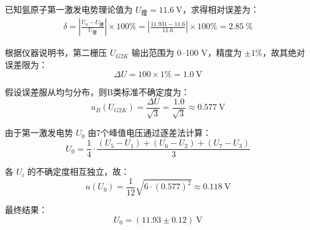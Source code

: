 \documentclass[]{../../templates/Report}%
\begin{document}
\begin{fullreportonly}
已知氩原子第一激发电势理论值为 $U_{\text{理}} = \SI{11.6}{\volt}$，求得相对误差为：
\begin{align*}
\delta = \left| \frac{\bar{U}_0 - U_{\text{理}}}{U_{\text{理}}} \right| \times 100\% = \left| \frac{11.931 - 11.6}{11.6} \right| \times 100\%= \SI{2.85}{\percent}
\end{align*}

根据仪器说明书，第二栅压 $U_{G2K}$ 输出范围为 0--100 V，精度为 $\pm 1\%$，故其绝对误差限为：
\[
\Delta U = 100 \times 1\% = \SI{1.0}{\volt}
\]

假设误差服从均匀分布，则B类标准不确定度为：
\[
u_B(U_{G2K}) = \frac{\Delta U}{\sqrt{3}} = \frac{1.0}{\sqrt{3}} \approx \SI{0.577}{\volt}
\]

由于第一激发电势 $U_0$ 由7个峰值电压通过逐差法计算：
\[
U_0 = \frac{1}{4} \cdot \frac{(U_5 - U_1) + (U_6 - U_2) + (U_7 - U_3)}{3}
\]

各 $U_i$ 的不确定度相互独立，故：
\[
u(U_0) = \frac{1}{12} \sqrt{6 \cdot (0.577)^2} \approx \SI{0.118}{\volt}
\]

最终结果：
\[
\boxed{U_0 = (\num{11.93} \pm \num{0.12})~\mathrm{V}}
\]


\end{fullreportonly}
\end{document}

